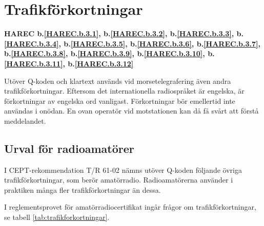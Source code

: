 \section{Trafikförkortningar}
\textbf{
HAREC b.\ref{HAREC.b.3.1}\label{myHAREC.b.3.1},
 b.\ref{HAREC.b.3.2}\label{myHAREC.b.3.2},
 b.\ref{HAREC.b.3.3}\label{myHAREC.b.3.3},
 b.\ref{HAREC.b.3.4}\label{myHAREC.b.3.4},
 b.\ref{HAREC.b.3.5}\label{myHAREC.b.3.5},
 b.\ref{HAREC.b.3.6}\label{myHAREC.b.3.6},
 b.\ref{HAREC.b.3.7}\label{myHAREC.b.3.7},
 b.\ref{HAREC.b.3.8}\label{myHAREC.b.3.8},
 b.\ref{HAREC.b.3.9}\label{myHAREC.b.3.9},
 b.\ref{HAREC.b.3.10}\label{myHAREC.b.3.10},
 b.\ref{HAREC.b.3.11}\label{myHAREC.b.3.11},
 b.\ref{HAREC.b.3.12}\label{myHAREC.b.3.12}
}

Utöver Q-koden och klartext används vid morsetelegrafering även andra
trafikförkortningar.
Eftersom det internationella radiospråket är engelska, är förkortningar av
engelska ord vanligast.
Förkortningar bör emellertid inte användas i onödan.
En ovan operatör vid motstationen kan då få svårt att förstå meddelandet.

\subsection{Urval för radioamatörer}

I CEPT-rekommendation T/R 61-02 nämns utöver Q-koden följande övriga
trafikförkortningar, som berör amatörradio.
Radioamatörerna använder i praktiken många fler trafikförkortningar än dessa.

I reglementsprovet för amatörradiocertifikat ingår frågor om
trafikförkortningar, se tabell \ref{tab:trafikforkortningar}.

